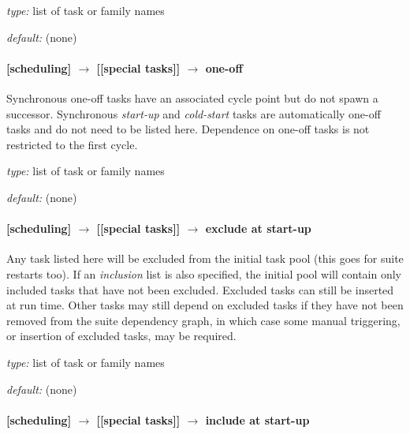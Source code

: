 \begin{myitemize}
    \item {\em type:} list of task or family names
    \item {\em default:} (none)
\end{myitemize}

\paragraph[one-off]{[scheduling] $\rightarrow$ [[special tasks]] $\rightarrow$ one-off}

Synchronous one-off tasks have an associated cycle point but do not spawn
a successor. Synchronous {\em start-up} and {\em cold-start} tasks are
automatically one-off tasks and do not need to be listed here.
Dependence on one-off tasks is not restricted to the first cycle.

\begin{myitemize}
\item {\em type:} list of task or family names
\item {\em default:} (none)
\end{myitemize}

\paragraph[exclude at start-up]{[scheduling] $\rightarrow$ [[special tasks]] $\rightarrow$ exclude at start-up}
\label{EASU}

Any task listed here will be excluded from the initial task pool (this
goes for suite restarts too). If an {\em inclusion} list is also
specified, the initial pool will contain only included tasks that have
not been excluded. Excluded tasks can still be inserted at run time.
Other tasks may still depend on excluded tasks if they have not been
removed from the suite dependency graph, in which case some manual
triggering, or insertion of excluded tasks, may be required.

\begin{myitemize}
    \item {\em type:} list of task or family names
    \item {\em default:} (none)
\end{myitemize}

\paragraph[include at start-up]{[scheduling] $\rightarrow$ [[special tasks]] $\rightarrow$ include at start-up}
\label{IASU}

